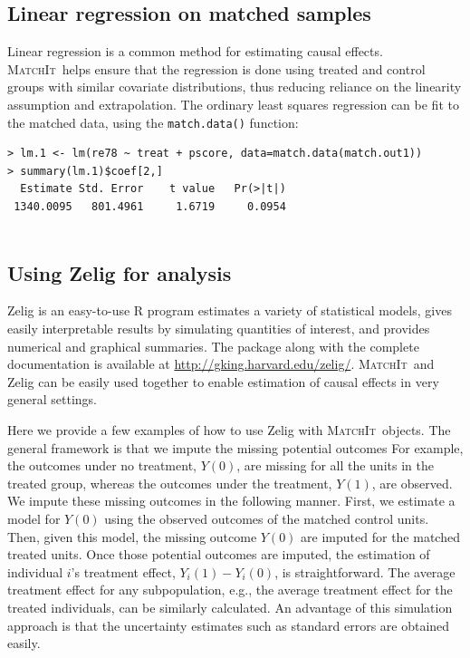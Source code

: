 \documentclass[oneside,letterpaper,titlepage]{article}
\newcommand{\MatchIt}{\textsc{MatchIt}}
\begin{document}
\subsection{Linear regression on matched samples}
Linear regression is a common method for estimating causal effects.  \MatchIt\ helps ensure that the regression is
done using treated and control groups with similar covariate distributions, thus reducing reliance on the linearity 
assumption and extrapolation.  The ordinary least squares regression can be fit to the matched data, using
the {\tt match.data()} function:

\begin{verbatim}
> lm.1 <- lm(re78 ~ treat + pscore, data=match.data(match.out1))                                                                                               
> summary(lm.1)$coef[2,]
  Estimate Std. Error    t value   Pr(>|t|)
 1340.0095   801.4961     1.6719     0.0954


\end{verbatim}

\subsection{Using Zelig for analysis}
Zelig is an easy-to-use R program estimates a variety of statistical
models, gives easily interpretable results by simulating quantities of
interest, and provides numerical and graphical summaries.  The package
along with the complete documentation is available at
\href{http://gking.harvard.edu/zelig/}{http://gking.harvard.edu/zelig/}.
\MatchIt\ and Zelig can be easily used together to enable estimation of
causal effects in very general settings.
                                                                                                                                                             
Here we provide a few examples of how to use Zelig with \MatchIt\ objects.
The general framework is that we impute the missing potential outcomes For
example, the outcomes under no treatment, $Y(0)$, are missing for all the
units in the treated group, whereas the outcomes under the treatment,
$Y(1)$, are observed.  We impute these missing outcomes in the following
manner. First, we estimate a model for $Y(0)$ using the observed outcomes
of the matched control units. Then, given this model, the missing outcome
$Y(0)$ are imputed for the matched treated units. Once those potential
outcomes are imputed, the estimation of individual $i$'s treatment
effect, $Y_i(1)-Y_i(0)$, is straightforward. The average treatment effect
for any subpopulation, e.g., the average treatment effect for the treated
individuals, can be similarly calculated. An advantage of this simulation
approach is that the uncertainty estimates such as standard errors are
obtained easily.
\end{document}
